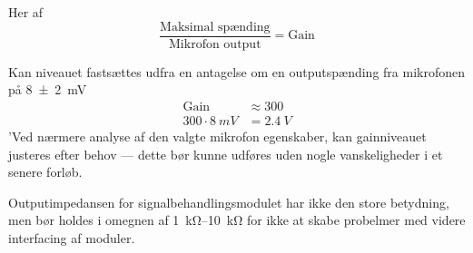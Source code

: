 Her af
\begin{equation}
    \frac{\textrm{Maksimal spænding}}{\textrm{Mikrofon output}} = \textrm{Gain}
\end{equation} 

Kan niveauet fastsættes udfra en antagelse om en outputspænding fra mikrofonen på \SI{8(2)}{mV} 
\begin{equation}
    \begin{split}
        \textrm{Gain} &\approx  300\\
       300 \cdot \SI{8}{mV} &= \SI{2.4}{V}
    \end{split}
\end{equation}
'Ved nærmere analyse af den valgte mikrofon egenskaber, kan gainniveauet justeres efter behov --- dette bør kunne udføres uden nogle vanskeligheder i et senere forløb.

Outputimpedansen for signalbehandlingsmodulet har ikke den store betydning, men bør holdes i omegnen af \SIrange{1}{10}{\kohm} for ikke at skabe probelmer med videre interfacing af moduler. 